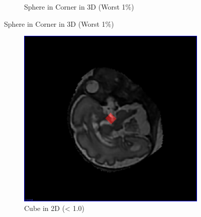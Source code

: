 \begin{figure}[H]
\begin{subfigure}[b]{0.5\textwidth}
    \caption{Sphere in Corner in 3D (Worst 1$\%$)}
    \label{fig:thresholdingresultsspherecorner3d}
  \end{subfigure}
\end{figure}

\begin{figure}[H]
  \ContinuedFloat 
  \centering
  \begin{subfigure}[b]{0.5\textwidth}
    \includegraphics[width=\textwidth]{images/thresholding/results/cube_2d.png}
    \caption{Cube in 2D (< 1.0)}
    \label{fig:thresholdingresultscube2d}
  \end{subfigure}%
  ~ %
  \begin{subfigure}[b]{0.5\textwidth}

\end{subfigure}
\end{figure}
